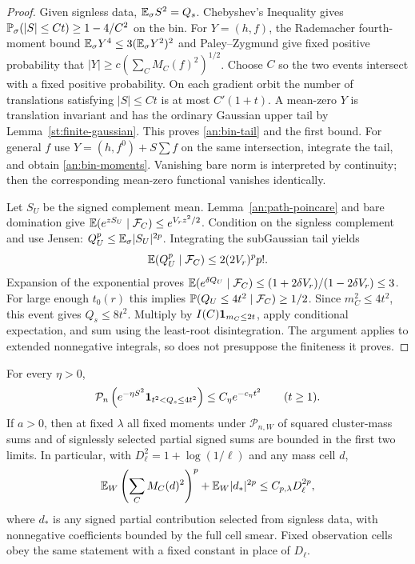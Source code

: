 \begin{proof}
Given signless data, $\mathbb E_\sigma S^2=Q_s$.  Chebyshev's Inequality
gives $\mathbb P_\sigma(|S|\le Ct)\ge1-4/C^2$ on the bin.  For
$Y=(h,f)$, the Rademacher fourth-moment bound
$\mathbb E_\sigma Y^4\le3(\mathbb E_\sigma Y^2)^2$ and Paley--Zygmund give
fixed positive probability that
$|Y|\ge c(\sum_CM_C(f)^2)^{1/2}$.  Choose $C$ so the two events
intersect with a fixed positive probability.  On each gradient
orbit the number of translations satisfying $|S|\le Ct$ is at most
$C'(1+t)$.  A mean-zero $Y$ is translation invariant and has the
ordinary Gaussian upper tail by Lemma~\ref{st:finite-gaussian}.
This proves \eqref{an:bin-tail} and the first bound.  For general
$f$ use $Y=(h,f^0)+S\sum f$ on the same intersection, integrate the
tail, and obtain \eqref{an:bin-moments}.  Vanishing bare norm is
interpreted by continuity; then the corresponding mean-zero
functional vanishes identically.

Let $S_U$ be the signed complement mean.  Lemma~\ref{an:path-poincare}
and bare domination give
$\mathbb E(e^{zS_U}\mid\mathcal F_C)\le e^{V_rz^2/2}$.
Condition on the signless complement and use Jensen:
$Q_U^p\le\mathbb E_\sigma|S_U|^{2p}$.  Integrating the subGaussian tail
yields
\[
 \mathbb E(Q_U^p\mid\mathcal F_C)\le 2(2V_r)^pp!.
\]
Expansion of the exponential proves
$\mathbb E(e^{\delta Q_U}\mid\mathcal F_C)
 \le(1+2\delta V_r)/(1-2\delta V_r)\le3$.
For large enough $t_0(r)$ this implies
$\mathbb P(Q_U\le4t^2\mid\mathcal F_C)\ge1/2$.
Since $m_C^2\le4t^2$, this event gives $Q_s\le8t^2$.
Multiply by $I(C)\mathbf 1_{m_C\le2t}$, apply conditional expectation,
and sum using the least-root disintegration.  The argument applies
to extended nonnegative integrals, so does not presuppose the
finiteness it proves.
\end{proof}

\begin{lemma}\label{an:weighted-moments}
For every $\eta>0$,
\begin{equation}
 \mathcal P_n\left(e^{-\eta S^2}
                      \mathbf 1_{t^2<Q_s\le4t^2}\right)
       \le C_\eta e^{-c_\eta t^2} \qquad(t\ge1).
 \label{an:damped-tail}
\end{equation}
If $a>0$, then at fixed $\lambda$ all fixed moments under
$\mathcal P_{n,W}$ of
squared cluster-mass sums and of signlessly selected partial signed
sums are bounded in the first two limits.  In particular, with
$D_\ell^2=1+\log(1/\ell)$ and any mass cell $d$,
\begin{equation}
 \mathbb E_W\left(\sum_CM_C(d)^2\right)^p
       +\mathbb E_W|d_*|^{2p}\le C_{p,\lambda}D_\ell^{2p},
 \label{an:cell-moments}
\end{equation}
where $d_*$ is any signed partial contribution selected from
signless data, with nonnegative coefficients bounded by the full
cell smear.  Fixed observation cells obey the same statement with
a fixed constant in place of $D_\ell$.
\end{lemma}

